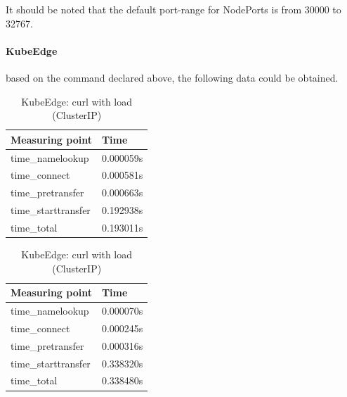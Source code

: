 \documentclass[MIC,Master,english]{twbook}%
\begin{document}
It should be noted that the default port-range for NodePorts is from 30000 to 32767.

\paragraph{KubeEdge} based on the command declared above, the following data could be obtained.

\begin{table}[ht]
    \begin{center}
        \begin{minipage}{.49\linewidth}
            \begin{center}
                \begin{tabular}{|l|l|}
                    \hline
                    Measuring point & Time \\
                    \hline
                    time\_namelookup & 0.000059s \\
                    time\_connect & 0.000581s \\
                    time\_pretransfer & 0.000663s \\
                    time\_starttransfer & 0.192938s \\
                    \hline
                    time\_total & 0.193011s \\
                    \hline
                \end{tabular}
                \caption{KubeEdge: curl no load (ClusterIP)}
                \label{tab:ke-con-noload}
            \end{center}
        \end{minipage}
        \begin{minipage}{.49\linewidth}
            \begin{center}
                \begin{tabular}{|l|l|}
                    \hline
                    Measuring point & Time \\
                    \hline
                    time\_namelookup & 0.000070s \\
                    time\_connect & 0.000245s \\
                    time\_pretransfer & 0.000316s \\
                    time\_starttransfer & 0.338320s \\
                    \hline
                    time\_total & 0.338480s \\
                    \hline
                \end{tabular}
                \caption{KubeEdge: curl with load (ClusterIP)}
                \label{tab:ke-con-load}
            \end{center}
        \end{minipage}
    \end{center}
\end{table}
\end{document}
